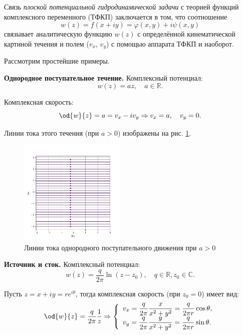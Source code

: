 \documentclass[a4paper, 14pt]{extarticle}
\begin{document}
Связь \textit{плоской потенциальной гидродинамической задачи} с теорией функций комплексного переменного (ТФКП) заключается в том, что соотношение
\[
w(z) = f(x+iy) = \varphi(x,y) + i  \psi(x,y)
\]
связывает аналитическую функцию $w(z)$ с определённой кинематической картиной течения и полем ($v_x$, $v_y$) с помощью аппарата ТФКП и наоборот.

\bigskip
Рассмотрим простейшие примеры.

\begin{problems}
\item 
\textbf{Однородное поступательное течение.}
Комплексный потенциал:
\[
	w(z) = a z,\quad
	a \in\mathbb{R}.
\]
		
Комплексная скорость:
\[
	\od{w}{z} = a = v_x - i v_y \Rightarrow
	v_x = a,\quad v_y = 0.
\]

Линии тока этого течения (при $a>0$) изображены на рис. \ref{fig:uniform_translation}.

\begin{figure}
	\centering
	\includegraphics[width=0.45\textwidth]{../img/uniform_translation.pdf}
	\caption{Линии тока однородного поступательного движения при $a>0$}
	\label{fig:uniform_translation}
\end{figure}


\item 
\textbf{Источник и сток.} Комплексный потенциал:
\[
	w(z) = \frac{q}{2\pi}\ln(z-z_0),\quad
	q \in\mathbb{R}, z_0\in\mathbb{C}.
\]
			
Пусть $z=x+iy=re^{i\theta}$, тогда комплексная скорость (при $z_0 = 0$) имеет вид:
\[
\od{w}{z} = \frac{q}{2\pi}\frac{1}{z} \Rightarrow
\left\{
\begin{array}{l}
\displaystyle v_x = \frac{q}{2 \pi}\frac{x}{x^2+y^2} = \frac{q}{2\pi r}\cos\theta,\\
\displaystyle v_y = \frac{q}{2 \pi}\frac{y}{x^2+y^2} = \frac{q}{2\pi r}\sin\theta.
\end{array}
\right.
\]



\end{problems}
\end{document}
